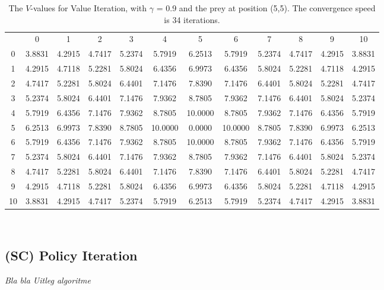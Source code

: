 \documentclass{article}
\begin{document}
\begin{landscape}
\begin{table}[tbp]
\centering
\begin{tabular} {c c c c c c c c c c c c}
 & 0 & 1 & 2 & 3 & 4 & 5 & 6 & 7 & 8 & 9 & 10 \\
0 &  3.8831 &  4.2915 &  4.7417 &  5.2374 &  5.7919 &  6.2513 &  5.7919 &  5.2374 &  4.7417 &  4.2915 &  3.8831\\
1 &  4.2915 &  4.7118 &  5.2281 &  5.8024 &  6.4356 &  6.9973 &  6.4356 &  5.8024 &  5.2281 &  4.7118 &  4.2915\\
2 &  4.7417 &  5.2281 &  5.8024 &  6.4401 &  7.1476 &  7.8390 &  7.1476 &  6.4401 &  5.8024 &  5.2281 &  4.7417\\
3 &  5.2374 &  5.8024 &  6.4401 &  7.1476 &  7.9362 &  8.7805 &  7.9362 &  7.1476 &  6.4401 &  5.8024 &  5.2374\\
4 &  5.7919 &  6.4356 &  7.1476 &  7.9362 &  8.7805 & 10.0000 &  8.7805 &  7.9362 &  7.1476 &  6.4356 &  5.7919\\
5 &  6.2513 &  6.9973 &  7.8390 &  8.7805 & 10.0000 &  0.0000 & 10.0000 &  8.7805 &  7.8390 &  6.9973 &  6.2513\\
6 &  5.7919 &  6.4356 &  7.1476 &  7.9362 &  8.7805 & 10.0000 &  8.7805 &  7.9362 &  7.1476 &  6.4356 &  5.7919\\
7 &  5.2374 &  5.8024 &  6.4401 &  7.1476 &  7.9362 &  8.7805 &  7.9362 &  7.1476 &  6.4401 &  5.8024 &  5.2374\\
8 &  4.7417 &  5.2281 &  5.8024 &  6.4401 &  7.1476 &  7.8390 &  7.1476 &  6.4401 &  5.8024 &  5.2281 &  4.7417\\
9 &  4.2915 &  4.7118 &  5.2281 &  5.8024 &  6.4356 &  6.9973 &  6.4356 &  5.8024 &  5.2281 &  4.7118 &  4.2915\\
10 &  3.8831 &  4.2915 &  4.7417 &  5.2374 &  5.7919 &  6.2513 &  5.7919 &  5.2374 &  4.7417 &  4.2915 &  3.8831\\\end{tabular}\\
\caption{The $V$-values for Value Iteration, with $\gamma$ = 0.9 and the prey at position (5,5). The convergence speed is 34 iterations.}
\label{valueiteration4}
\end{table}


\end{landscape}

\subsection{(SC) Policy Iteration}
\emph{Bla bla Uitleg algoritme} \\
\end{document}
